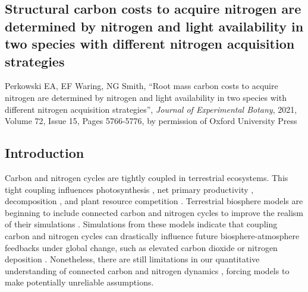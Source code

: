 \begin{singlespace}
    \chapter{\textbf{Structural carbon costs to acquire nitrogen are determined by nitrogen and light availability in two species with different nitrogen acquisition strategies}}
\end{singlespace}

\begin{singlespace}
    \noindent Perkowski EA, EF Waring, NG Smith, ``Root mass carbon costs to acquire nitrogen are determined by nitrogen and light availability in two species with different nitrogen acquisition strategies'', \textit{Journal of Experimental Botany}, 2021, Volume 72, Issue 15, Pages 5766-5776, by permission of Oxford University Press
\end{singlespace}

\section{Introduction} 
\noindent Carbon and nitrogen cycles are tightly coupled in terrestrial ecosystems. This tight coupling influences photosynthesis , net primary productivity , decomposition , and plant resource competition . Terrestrial biosphere models are beginning to include connected carbon and nitrogen cycles to improve the realism of their simulations . Simulations from these models indicate that coupling carbon and nitrogen cycles can drastically influence future biosphere-atmosphere feedbacks under global change, such as elevated carbon dioxide or nitrogen deposition . Nonetheless, there are still limitations in our quantitative understanding of connected carbon and nitrogen dynamics , forcing models to make potentially unreliable assumptions.

